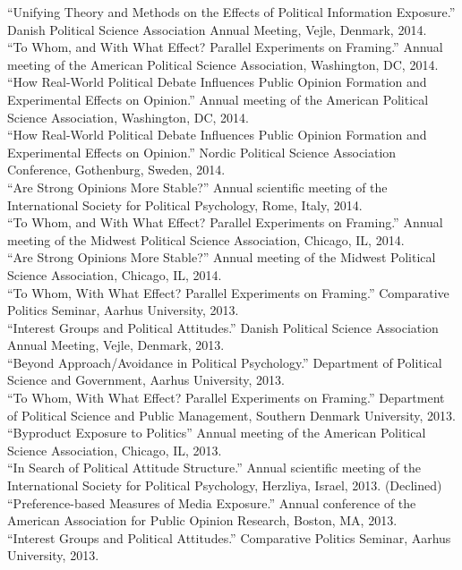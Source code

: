\documentclass[12pt]{article}
\renewcommand{\section}[1]{\pagebreak[3]%
    \llap{\scshape\smash{\parbox[t]{\marginparwidth}{\raggedright {\color{lg}#1}}}}%
    \vspace{-\baselineskip}\par}
\newcommand{\entry}[1]{\indent {\color{lg}\guillemotright}\hspace{2pt}#1\vspace{.25em}\\}
\begin{document}
\section{Conference\\Papers\\and\\Invited\\Presentations}
\entry{``Unifying Theory and Methods on the Effects of Political Information Exposure.'' Danish Political Science Association Annual Meeting, Vejle, Denmark, 2014.}
\entry{``To Whom, and With What Effect? Parallel Experiments on Framing.'' Annual meeting of the American Political Science Association, Washington, DC, 2014.}
\entry{``How Real-World Political Debate Influences Public Opinion Formation and Experimental Effects on Opinion.'' Annual meeting of the American Political Science Association, Washington, DC, 2014.}
\entry{``How Real-World Political Debate Influences Public Opinion Formation and Experimental Effects on Opinion.'' Nordic Political Science Association Conference, Gothenburg, Sweden, 2014.}
\entry{``Are Strong Opinions More Stable?'' Annual scientific meeting of the International Society for Political Psychology, Rome, Italy, 2014.}
\entry{``To Whom, and With What Effect? Parallel Experiments on Framing.'' Annual meeting of the Midwest Political Science Association, Chicago, IL, 2014.}
\entry{``Are Strong Opinions More Stable?'' Annual meeting of the Midwest Political Science Association, Chicago, IL, 2014.}
\entry{``To Whom, With What Effect? Parallel Experiments on Framing.'' Comparative Politics Seminar, Aarhus University, 2013.}
\entry{``Interest Groups and Political Attitudes.'' Danish Political Science Association Annual Meeting, Vejle, Denmark, 2013.}
\entry{``Beyond Approach/Avoidance in Political Psychology.'' Department of Political Science and Government, Aarhus University, 2013.}
\entry{``To Whom, With What Effect? Parallel Experiments on Framing.'' Department of Political Science and Public Management, Southern Denmark University, 2013.}
\entry{``Byproduct Exposure to Politics'' Annual meeting of the American Political Science Association, Chicago, IL, 2013.}
\entry{``In Search of Political Attitude Structure.'' Annual scientific meeting of the International Society for Political Psychology, Herzliya, Israel, 2013. (Declined)}
\entry{``Preference-based Measures of Media Exposure.'' Annual conference of the American Association for Public Opinion Research, Boston, MA, 2013.}
\entry{``Interest Groups and Political Attitudes.'' Comparative Politics Seminar, Aarhus University, 2013.}
\end{document}
